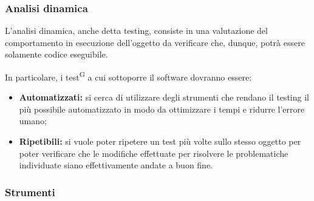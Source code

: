\subsubsection{Analisi dinamica}
L'analisi dinamica, anche detta testing, consiste in una valutazione del comportamento in esecuzione dell'oggetto da verificare che, dunque, potrà essere solamente codice eseguibile.

In particolare, i test\textsuperscript{G} a cui sottoporre il software dovranno essere:
\begin{itemize}
    \item \textbf{Automatizzati:} si cerca di utilizzare degli strumenti che rendano il testing il più possibile automatizzato in modo da ottimizzare i tempi e ridurre l'errore umano;
    \item \textbf{Ripetibili:} si vuole poter ripetere un test più volte sullo stesso oggetto per poter verificare che le modifiche effettuate per risolvere le problematiche individuate siano effettivamente andate a buon fine.
\end{itemize}


\subsubsection{Strumenti}\label{sec:processi_di_supporto:verifica:strumenti}
